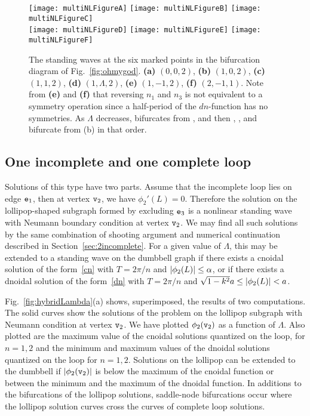 \documentclass{article}
\numberwithin{equation}{section}
\numberwithin{figure}{section}
\begin{document}
\begin{figure}[htbp] %
   \centering
   \texttt{[image: multiNLFigureA]}
   \texttt{[image: multiNLFigureB]}
   \texttt{[image: multiNLFigureC]}\\
   \texttt{[image: multiNLFigureD]}
   \texttt{[image: multiNLFigureE]}
   \texttt{[image: multiNLFigureF]}
   \caption{The standing waves at the six marked points in the bifurcation diagram of Fig.~\ref{fig:ohmygod}. \textbf{(a)} $(0,0,2)$, \textbf{(b)} $(1,0,2)$, \textbf{(c)} $(1,1,2)$, \textbf{(d)} $(1,\Lambda,2)$, \textbf{(e)} $(1,-1,2)$, \textbf{(f)} $(2,-1,1)$. Note from \textbf{(e)} and \textbf{(f)} that reversing $n_1$ and $n_3$ is not equivalent to a symmetry operation since a half-period of the $dn$-function has no symmetries. As $\Lambda$ decreases,  bifurcates from , and then , , and  bifurcate from (b) in that order.}
\label{fig:completerings}
\end{figure}


\subsection{One incomplete and one complete loop}
\label{sec:oneOfEach}

Solutions of this type have two parts. Assume that the incomplete loop lies on edge $\mathtt{e}_1$, then at vertex $\mathtt{v}_2$, we have $\phi_2'(L) =0$. Therefore the solution on the lollipop-shaped subgraph formed by excluding $\mathtt{e}_3$ is a nonlinear standing wave with Neumann boundary condition at vertex $\mathtt{v}_2$. We may find all such solutions by the same combination of shooting argument and numerical continuation described in Section~\ref{sec:2incomplete}. For a given value of $\Lambda$, this may be extended to a standing wave on the dumbbell graph if there exists a cnoidal solution of the form~\eqref{cn} with $T = 2\pi/n$ and $\left\lvert\phi_2(L)\right\rvert \le \alpha$, or if there exists a dnoidal solution of the form~\eqref{dn} with $T = 2 \pi/n$ and $\sqrt{1-k^2}a \le \left\lvert\phi_2(L)\right\rvert < a$. 

Fig.~\ref{fig:hybridLambda}(a) shows, superimposed, the results of two computations. The solid curves show the solutions of the problem on the lollipop subgraph with Neumann condition at vertex $\mathtt{v}_2$. We have plotted $\phi_2(\mathtt{v}_2)$ as a function of $\Lambda$. Also plotted are the maximum value of the cnoidal solutions quantized on the loop, for $n=1,2$ and the minimum and maximum values of the dnoidal solutions quantized on the loop for $n=1,2$. Solutions on the lollipop can be extended to the dumbbell  if $\left\lvert\phi_2(\mathtt{v}_2)\right\rvert$ is below the maximum of the cnoidal function or between the minimum and the maximum of the dnoidal function. In additions to the bifurcations of the lollipop solutions,  saddle-node bifurcations occur where the lollipop solution curves cross the curves of complete loop solutions. 
\end{document}

